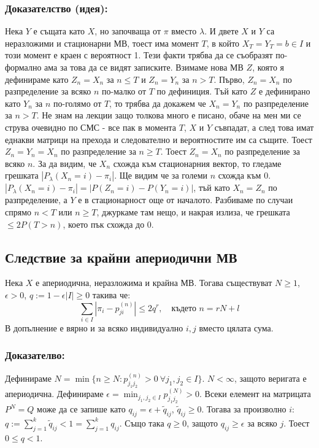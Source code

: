 \documentclass{article}
\begin{document}
\subsubsection*{Доказателство (идея):}
Нека $Y$ е същата като $X$, но започваща от $\pi$ вместо $\lambda$. И двете $X$ и $Y$ са неразложими и стационарни МВ, тоест има момент $T$, в 
който $X_T = Y_T = b \in I$ и този момент е краен с вероятност 1. Тези факти трябва да се съобразят по-формално ама за това да се 
видят записките. Взимаме нова МВ $Z$, която я дефинираме като $Z_n = X_n$ за $n \leq T$ и $Z_n = Y_n$ за $n > T$. Първо, $Z_n = X_n$ по разпределение 
за всяко $n$ по-малко от $T$ по дефиниция. Тъй като $Z$ е дефинирано като $Y_n$ за $n$ по-голямо от $T$, то трябва да докажем 
че $X_n = Y_n$ по разпределение за $n > T$. Не знам на лекции защо толкова много е писано, обаче на мен ми се струва очевидно по СМС - все пак 
в момента $T$, $X$ и $Y$ съвпадат, а след това имат еднакви матрици на прехода и следователно и вероятностите им са същите. 
Тоест $Z_n = Y_n = X_n$ по разпределение за $n \geq T$. Тоест $Z_n = X_n$ по разпределение за всяко $n$. За да видим, че 
$X_n$ схожда към стационарния вектор, то гледаме грешката $|P_\lambda(X_n = i) - \pi_i|$. Ще видим че за големи $n$ схожда към 0. 
$|P_\lambda(X_n = i) - \pi_i| = |P(Z_n = i) - P(Y_n = i)|$, тъй като $X_n = Z_n$ по разпределение, а $Y$ е в стационарност още от началото. Разбиваме по случаи 
спрямо $n < T$ или $n \geq T$, джуркаме там нещо, и накрая излиза, че грешката $\leq 2P(T > n)$, което пък схожда до 0.

\subsection{Следствие за крайни апериодични МВ}
Нека $X$ е апериодична, неразложима и крайна МВ. Тогава съществуват $N \geq 1$, $\epsilon > 0$, $q := 1 - \epsilon|I| \geq 0$ такива че:
$$\sum_{i \in I} |\pi_i - p_{ji}^{(n)}| \leq 2q^r, \quad \text{където } n = rN + l$$
В допълнение е вярно и за всяко индивидуално $i,j$ вместо цялата сума.

\subsubsection*{Доказателво:}
Дефинираме $N = \min\{n \geq N : p_{j_1j_2}^{(n)} > 0 \ \forall j_1,j_2 \in I\}$. $N < \infty$, защото веригата е апериодична. Дефинираме $\epsilon = \min_{j_1,j_2 \in I} p_{j_1j_2}^{(N)} > 0$. 
Всеки елемент на матрицата $P^N = Q$ може да се запише като $q_{ij} = \epsilon + \tilde{q}_{ij}$, $\tilde{q}_{ij} \geq 0$. 
Тогава за произволно $i$: $q := \sum_{j=1}^k \tilde{q}_{ij} < 1 = \sum_{j=1}^k q_{ij}$. 
Също така $q \geq 0$, защото $q_{ij} \geq \epsilon$ за всяко $j$. Тоест $0 \leq q < 1$. \\
\end{document}
